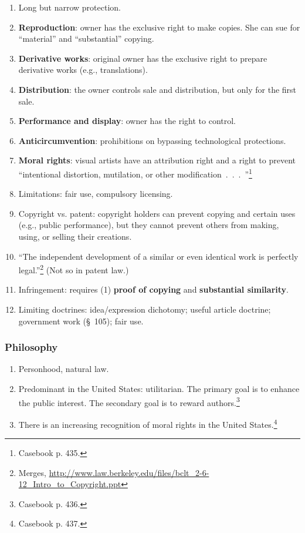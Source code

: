 \begin{enumerate}
    \item Long but narrow protection.
    \item \textbf{Reproduction}: owner has the exclusive right to make copies. 
    She can sue for ``material'' and ``substantial'' copying.
    \item \textbf{Derivative works}: original owner has the exclusive right to 
    prepare derivative works (e.g., translations).
    \item \textbf{Distribution}: the owner controls sale and distribution, but 
    only for the first sale.
    \item \textbf{Performance and display}: owner has the right to control.
    \item \textbf{Anticircumvention}: prohibitions on bypassing technological 
    protections.
    \item \textbf{Moral rights}: visual artists have an attribution right and 
    a right to prevent ``intentional distortion, mutilation, or other 
    modification~.~.~.~''\footnote{Casebook p. 435.}
    \item Limitations: fair use, compulsory licensing.
    \item Copyright vs. patent: copyright holders can prevent copying and 
    certain uses (e.g., public performance), but they cannot prevent others 
    from making, using, or selling their creations.
    \item ``The independent development of a similar or even identical work is 
    perfectly legal.''\footnote{Merges, 
    \url{http://www.law.berkeley.edu/files/bclt_2-6-12_Intro_to_Copyright.ppt}} 
    (Not so in patent law.)
    \item Infringement: requires (1) \textbf{proof of copying} and 
    \textbf{substantial similarity}.
    \item Limiting doctrines: idea/expression dichotomy; useful article 
    doctrine; government work (\S\ 105);  fair use.
\end{enumerate}

\subsubsection{Philosophy}

\begin{enumerate}
    \item Personhood, natural law.
    \item Predominant in the United States: utilitarian. The primary goal is 
    to enhance the public interest. The secondary goal is to reward 
    authors.\footnote{Casebook p. 436.}
    \item There is an increasing recognition of moral rights in the United 
    States.\footnote{Casebook p. 437.}
\end{enumerate}

